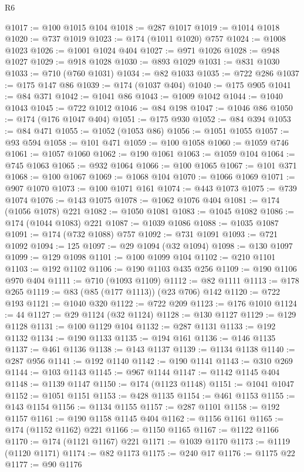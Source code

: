 \begin{lexlean}{R6}
\begin{coremodule}
@1017 := @100 @1015 @104
@1018 := @287 @1017
@1019 := @1014 @1018
@1020 := @737 @1019
@1023 := @174 (@1011 @1020) @757
@1024 := @1008 @1023
@1026 := @1001 @1024 @404
@1027 := @971 @1026
@1028 := @948 @1027
@1029 := @918 @1028
@1030 := @893 @1029
@1031 := @831 @1030
@1033 := @710 (@760 @1031)
@1034 := @82 @1033
@1035 := @722 @286
@1037 := @175 @147 @86
@1039 := @174 (@1037 @404)
@1040 := @175 @905
@1041 := @84 @371
@1042 := @1041 @86
@1043 := @1009 @1042
@1044 := @1040 @1043
@1045 := @722 @1012
@1046 := @84 @198
@1047 := @1046 @86
@1050 := @174 (@176 @1047 @404)
@1051 := @175 @930
@1052 := @84 @394
@1053 := @84 @471
@1055 := @1052 (@1053 @86)
@1056 := @1051 @1055
@1057 := @93 @594
@1058 := @101 @471
@1059 := @100 @1058
@1060 := @1059 @746
@1061 := @1057 @1060
@1062 := @190 @1061
@1063 := @1059 @104
@1064 := @745 @1063
@1065 := @932 @1064
@1066 := @100 @1065
@1067 := @101 @371
@1068 := @100 @1067
@1069 := @1068 @104
@1070 := @1066 @1069
@1071 := @907 @1070
@1073 := @100 @1071 @161
@1074 := @443 @1073
@1075 := @739 @1074
@1076 := @143 @1075
@1078 := @1062 @1076 @404
@1081 := @174 (@1056 @1078) @221
@1082 := @1050 @1081
@1083 := @1045 @1082
@1086 := @174 (@1044 @1083) @221
@1087 := @1039 @1086
@1088 := @1035 @1087
@1091 := @174 (@732 @1088) @757
@1092 := @731 @1091
@1093 := @721 @1092
@1094 := 125
@1097 := @29 @1094 (@32 @1094)
@1098 := @130 @1097
@1099 := @129 @1098
@1101 := @100 @1099 @104
@1102 := @210 @1101
@1103 := @192 @1102
@1106 := @190 @1103 @435 @256
@1109 := @190 @1106 @970 @404
@1111 := @710 (@1093 @1109)
@1112 := @82 @1111
@1113 := @178 @265
@1119 := @83 (@85 (@177 @1113)) (@23 @706) @142
@1120 := @722 @193
@1121 := @1040 @320
@1122 := @722 @209
@1123 := @176 @1010
@1124 := 44
@1127 := @29 @1124 (@32 @1124)
@1128 := @130 @1127
@1129 := @129 @1128
@1131 := @100 @1129 @104
@1132 := @287 @1131
@1133 := @192 @1132
@1134 := @190 @1133
@1135 := @194 @161
@1136 := @146 @1135
@1137 := @461 @1136
@1138 := @143 @1137
@1139 := @1134 @1138
@1140 := @287 @956
@1141 := @192 @1140
@1142 := @190 @1141
@1143 := @310 @269
@1144 := @103 @1143
@1145 := @967 @1144
@1147 := @1142 @1145 @404
@1148 := @1139 @1147
@1150 := @174 (@1123 @1148)
@1151 := @1041 @1047
@1152 := @1051 @1151
@1153 := @428 @1135
@1154 := @461 @1153
@1155 := @143 @1154
@1156 := @1134 @1155
@1157 := @287 @1101
@1158 := @192 @1157
@1161 := @190 @1158 @1145 @404
@1162 := @1156 @1161
@1165 := @174 (@1152 @1162) @221
@1166 := @1150 @1165
@1167 := @1122 @1166
@1170 := @174 (@1121 @1167) @221
@1171 := @1039 @1170
@1173 := @1119 (@1120 @1171)
@1174 := @82 @1173
@1175 := @240 @17
@1176 := @1175 @22
@1177 := @90 @1176

\end{coremodule}
\end{lexlean}
